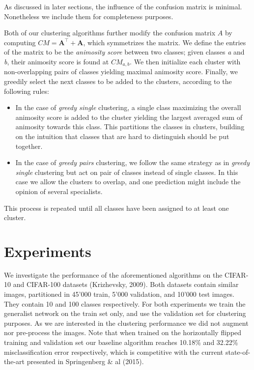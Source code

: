 \documentclass[12pt]{article}
\begin{document}
As discussed in later sections, the influence of the confusion matrix is
minimal. Nonetheless we include them for completeness purposes.

Both of our clustering algorithms further modify the confusion matrix
$A$ by computing $CM = \textbf{A}^\top + \textbf{A}$, which symmetrizes
the matrix. We define the entries of the matrix to be the
\emph{animosity score} between two classes; given classes \emph{a} and
\emph{b}, their animosity score is found at $CM_{a, b}$. We then
initialize each cluster with non-overlapping pairs of classes yielding
maximal animosity score. Finally, we greedily select the next classes to
be added to the clusters, according to the following rules:

\begin{itemize}
\item
  In the case of \emph{greedy single} clustering, a single class
  maximizing the overall animosity score is added to the cluster
  yielding the largest averaged sum of animosity towards this class.
  This partitions the classes in clusters, building on the intuition
  that classes that are hard to distinguish should be put together.
\item
  In the case of \emph{greedy pairs} clustering, we follow the same
  strategy as in \emph{greedy single} clustering but act on pair of
  classes instead of single classes. In this case we allow the clusters
  to overlap, and one prediction might include the opinion of several
  specialists.
\end{itemize}

This process is repeated until all classes have been assigned to at
least one cluster.

\section{Experiments}\label{experiments}

We investigate the performance of the aforementioned algorithms on the
CIFAR-10 and CIFAR-100 datasets (Krizhevsky, 2009). Both datasets
contain similar images, partitioned in 45'000 train, 5'000 validation,
and 10'000 test images. They contain 10 and 100 classes respectively.
For both experiments we train the generalist network on the train set
only, and use the validation set for clustering purposes. As we are
interested in the clustering performance we did not augment nor
pre-process the images. Note that when trained on the horizontally
flipped training and validation set our baseline algorithm reaches
10.18\% and 32.22\% misclassification error respectively, which is
competitive with the current state-of-the-art presented in Springenberg
\& al (2015).
\end{document}
